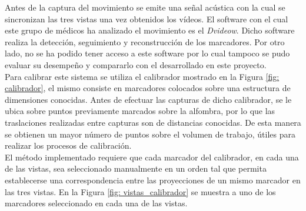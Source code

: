 Antes de la captura del movimiento se emite una señal acústica con la cual se sincronizan las tres vistas una vez obtenidos los vídeos. El software con el cual este grupo de médicos ha analizado el movimiento es el \textit{Dvideow}.            
 Dicho software realiza la detección, seguimiento y reconstrucción de los marcadores. Por otro lado, no se ha podido tener acceso a este software por lo cual tampoco se pudo evaluar su desempeño y compararlo con el desarrollado en este proyecto.\\

Para calibrar este sistema se utiliza el calibrador mostrado en la Figura \ref{fig: calibrador}, el mismo consiste en marcadores colocados sobre una estructura de dimensiones conocidas. Antes de efectuar las capturas de dicho calibrador, se le ubica sobre puntos previamente marcados sobre la alfombra, por lo que las traslaciones realizadas entre capturas son de distancias conocidas. De esta manera se obtienen un mayor número de puntos sobre el volumen de trabajo, útiles para realizar los procesos de calibración.\\


El método implementado requiere que cada marcador del calibrador, en cada una de las vistas, sea seleccionado manualmente en un orden tal que permita establecerse una correspondencia entre las proyecciones de un mismo marcador en las tres vistas. En la Figura \ref{fig: vistas_calibrador} se muestra a uno de los marcadores seleccionado en cada una de las vistas.\\


